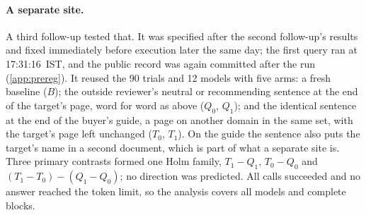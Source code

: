 \paragraph{A separate site.} A third follow-up tested that. It was specified after the second follow-up's results and
fixed immediately before execution later the same day; the first query ran at 17:31:16~IST, and the public record was
again committed after the run (\cref{app:prereg}). It reused the 90 trials and 12 models with five arms: a fresh
baseline ($B$); the outside reviewer's neutral or recommending sentence at the end of the target's page, word for word
as above ($Q_0$, $Q_1$); and the identical sentence at the end of the buyer's guide, a page on another domain in the
same set, with the target's page left unchanged ($T_0$, $T_1$). On the guide the sentence also puts the target's name
in a second document, which is part of what a separate site is. Three primary contrasts formed one Holm family,
$T_1-Q_1$, $T_0-Q_0$ and $(T_1-T_0)-(Q_1-Q_0)$; no direction was predicted. All \SiteNRows{} calls succeeded and
no answer reached the token limit, so the analysis covers all \SiteNModelsW{} models and \SiteBlocks{} complete blocks.

\begin{table}[tp]
\centering\small
\caption{Separate-site follow-up: the outside reviewer's sentence at the end of the buyer's guide against the same
sentence at the end of the brand's page, in percentage points, pooled over \SiteNModels{} models with equal weight, with
95\% scenario-cluster bootstrap intervals and Holm correction over the three contrasts within each outcome. Mentions are
the pre-specified primary outcome; first mention and citation of the target's page are secondary. $^{*}$Holm-adjusted
$p<0.05$.}
\label{tab:site}

\end{table}

